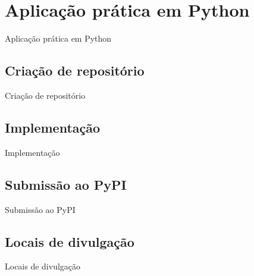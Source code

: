 \section{Aplicação prática em Python}
\label{s.python_application}

\begin{frame}{Aplicação prática em Python}
\end{frame}

\subsection{Criação de repositório}
\label{ss.repository_creation}

\begin{frame}{Criação de repositório}
\end{frame}

\subsection{Implementação}
\label{ss.implementation}

\begin{frame}{Implementação}
\end{frame}

\subsection{Submissão ao PyPI}
\label{ss.pypi_submission}

\begin{frame}{Submissão ao PyPI}
\end{frame}

\subsection{Locais de divulgação}
\label{ss.places_sharing}

\begin{frame}{Locais de divulgação}
\end{frame}